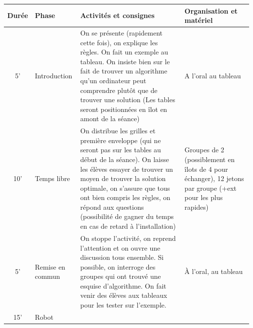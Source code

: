 \documentclass[12pt, a4paper]{article}
\begin{document}
	\begin{longtable}{c|m{3.9cm}|m{8.4cm}|m{2.4cm}}		\textbf{Durée} & \textbf{Phase} & \textbf{Activités et consignes} & \textbf{Organisation et matériel} \\ \hline\hline
		
		5' &
		
		Introduction
		
		&
		
		On se présente (rapidement cette fois), on explique les règles. On fait un exemple au tableau. On insiste bien sur le fait de trouver un algorithme qu'un ordinateur peut comprendre plutôt que de trouver une solution (Les tables seront positionnées en îlot en amont de la séance)
		
		& 
		
		A l'oral au tableau
		
		\\ \hline
		
		10' & 
		
		Temps libre
		
		&
		
		On distribue les grilles et première enveloppe (qui ne seront pas sur les tables au début de la séance). On laisse les élèves essayer de trouver un moyen de trouver la solution optimale, on s'assure que tous ont bien compris les règles, on répond aux questions (possibilité de gagner du temps en cas de retard à l'installation)
		
		& 
		
		Groupes de 2 (possiblement en îlots de 4 pour échanger), 12 jetons par groupe (+ext pour les plus rapides)
		
		\\ \hline

        5' &
		
		Remise en commun
		
		&
		
		On stoppe l'activité, on reprend l'attention et on ouvre une discussion tous ensemble. Si possible, on interroge des groupes qui ont trouvé une esquise d'algorithme. On fait venir des élèves aux tableaux pour les tester sur l'exemple.
		
		& 
		
		À l'oral, au tableau
		
		\\ \hline
		
		15'
		
		&
		
		Robot
		

\end{longtable}
\end{document}
